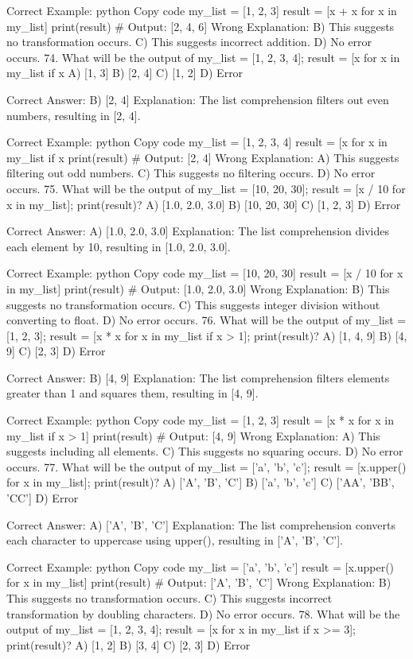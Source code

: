 Correct Example:
python
Copy code
my_list = [1, 2, 3]
result = [x + x for x in my_list]
print(result)  # Output: [2, 4, 6]
Wrong Explanation:
B) This suggests no transformation occurs.
C) This suggests incorrect addition.
D) No error occurs.
74. What will be the output of my_list = [1, 2, 3, 4]; result = [x for x in my_list if x %
A) [1, 3]
B) [2, 4]
C) [1, 2]
D) Error

Correct Answer: B) [2, 4]
Explanation: The list comprehension filters out even numbers, resulting in [2, 4].

Correct Example:
python
Copy code
my_list = [1, 2, 3, 4]
result = [x for x in my_list if x %
print(result)  # Output: [2, 4]
Wrong Explanation:
A) This suggests filtering out odd numbers.
C) This suggests no filtering occurs.
D) No error occurs.
75. What will be the output of my_list = [10, 20, 30]; result = [x / 10 for x in my_list]; print(result)?
A) [1.0, 2.0, 3.0]
B) [10, 20, 30]
C) [1, 2, 3]
D) Error

Correct Answer: A) [1.0, 2.0, 3.0]
Explanation: The list comprehension divides each element by 10, resulting in [1.0, 2.0, 3.0].

Correct Example:
python
Copy code
my_list = [10, 20, 30]
result = [x / 10 for x in my_list]
print(result)  # Output: [1.0, 2.0, 3.0]
Wrong Explanation:
B) This suggests no transformation occurs.
C) This suggests integer division without converting to float.
D) No error occurs.
76. What will be the output of my_list = [1, 2, 3]; result = [x * x for x in my_list if x > 1]; print(result)?
A) [1, 4, 9]
B) [4, 9]
C) [2, 3]
D) Error

Correct Answer: B) [4, 9]
Explanation: The list comprehension filters elements greater than 1 and squares them, resulting in [4, 9].

Correct Example:
python
Copy code
my_list = [1, 2, 3]
result = [x * x for x in my_list if x > 1]
print(result)  # Output: [4, 9]
Wrong Explanation:
A) This suggests including all elements.
C) This suggests no squaring occurs.
D) No error occurs.
77. What will be the output of my_list = ['a', 'b', 'c']; result = [x.upper() for x in my_list]; print(result)?
A) ['A', 'B', 'C']
B) ['a', 'b', 'c']
C) ['AA', 'BB', 'CC']
D) Error

Correct Answer: A) ['A', 'B', 'C']
Explanation: The list comprehension converts each character to uppercase using upper(), resulting in ['A', 'B', 'C'].

Correct Example:
python
Copy code
my_list = ['a', 'b', 'c']
result = [x.upper() for x in my_list]
print(result)  # Output: ['A', 'B', 'C']
Wrong Explanation:
B) This suggests no transformation occurs.
C) This suggests incorrect transformation by doubling characters.
D) No error occurs.
78. What will be the output of my_list = [1, 2, 3, 4]; result = [x for x in my_list if x >= 3]; print(result)?
A) [1, 2]
B) [3, 4]
C) [2, 3]
D) Error


